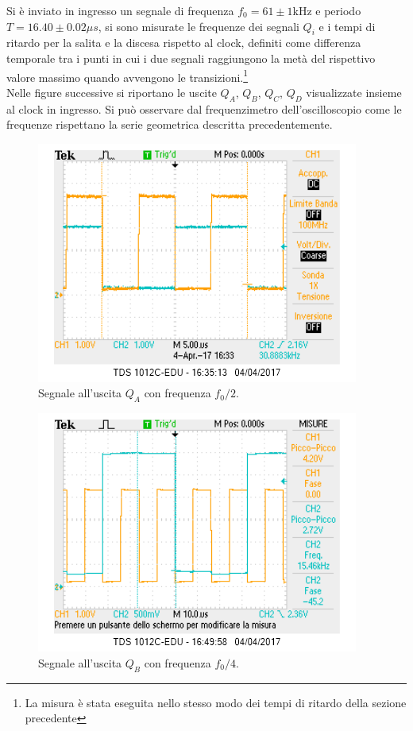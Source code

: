 \documentclass[10pt,a4paper]{article}
\begin{document}
Si è inviato in ingresso un segnale di frequenza $f_0 = 61 \pm 1$kHz e periodo $T = 16.40 \pm 0.02 \mu s$, si sono misurate le frequenze dei segnali $Q_i$ e i tempi di ritardo per la salita e la discesa rispetto al clock, definiti come differenza temporale tra i punti in cui i due segnali raggiungono la metà del rispettivo valore massimo quando avvengono le transizioni.\footnote{La misura è stata eseguita nello stesso modo dei tempi di ritardo della sezione precedente}\\

Nelle figure successive si riportano le uscite $Q_A$, $Q_B$, $Q_C$, $Q_D$ visualizzate insieme al clock in ingresso. Si può osservare dal frequenzimetro dell'oscilloscopio come le frequenze rispettano la serie geometrica descritta precedentemente.\\

\begin{figure}
\centering
\includegraphics[scale=1.0]{QA1-2.png}
\caption{Segnale all'uscita $Q_A$ con frequenza $f_0/2$.\label{freq2}}
\end{figure}

\begin{figure}
\centering
\includegraphics[scale=1.0]{QB1-4.png}
\caption{Segnale all'uscita $Q_B$ con frequenza $f_0/4$.\label{freq4}}
\end{figure}
\end{document}
